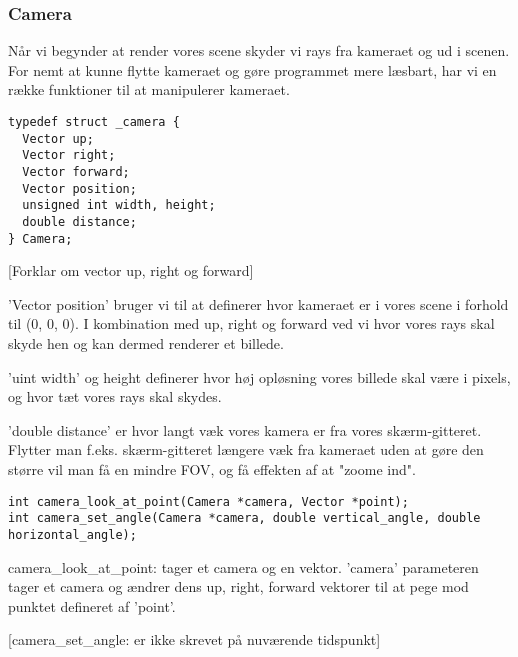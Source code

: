 \subsubsection{Camera}
Når vi begynder at render vores scene skyder vi rays fra kameraet og ud i scenen. For nemt at kunne flytte kameraet og gøre programmet mere læsbart, har vi en række funktioner til at manipulerer kameraet.

\begin{lstlisting}[style=Cstyle, caption=Definition af Camera struct ]
typedef struct _camera {
  Vector up;
  Vector right;
  Vector forward;
  Vector position;
  unsigned int width, height;
  double distance;
} Camera;
\end{lstlisting}

[Forklar om vector up, right og forward]

'Vector position' bruger vi til at definerer hvor kameraet er i vores scene i forhold til (0, 0, 0). I kombination med up, right og forward ved vi hvor vores rays skal skyde hen og kan dermed renderer et billede.

'uint width' og height definerer hvor høj opløsning vores billede skal være i pixels, og hvor tæt vores rays skal skydes.

'double distance' er hvor langt væk vores kamera er fra vores skærm-gitteret. Flytter man f.eks. skærm-gitteret længere væk fra kameraet uden at gøre den større vil man få en mindre FOV\cite{fov}, og få effekten af at "zoome ind".

\begin{lstlisting}[style=Cstyle, caption=Prototyper for funktioner der manipulerer camera-structen]
int camera_look_at_point(Camera *camera, Vector *point);
int camera_set_angle(Camera *camera, double vertical_angle, double horizontal_angle);
\end{lstlisting}

camera\_look\_at\_point: tager et camera og en vektor. 'camera' parameteren tager et camera og ændrer dens up, right, forward vektorer til at pege mod punktet defineret af 'point'.

[camera\_set\_angle: er ikke skrevet på nuværende tidspunkt]